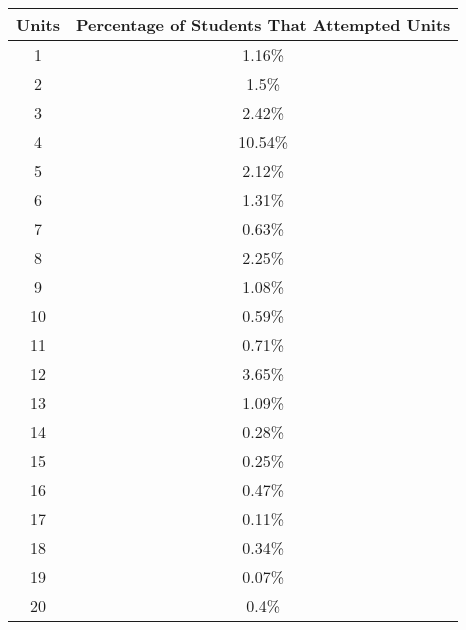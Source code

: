 \begin{center}
\begin{tabular}{|c|c|}
\hline
Units & Percentage of Students That Attempted Units \\ \hline
1     & 1.16\%                                      \\ \hline
2     & 1.5\%                                       \\ \hline
3     & 2.42\%                                      \\ \hline
4     & 10.54\%                                     \\ \hline
5     & 2.12\%                                      \\ \hline
6     & 1.31\%                                      \\ \hline
7     & 0.63\%                                      \\ \hline
8     & 2.25\%                                      \\ \hline
9     & 1.08\%                                      \\ \hline
10    & 0.59\%                                      \\ \hline
11    & 0.71\%                                      \\ \hline
12    & 3.65\%                                      \\ \hline
13    & 1.09\%                                      \\ \hline
14    & 0.28\%                                      \\ \hline
15    & 0.25\%                                      \\ \hline
16    & 0.47\%                                      \\ \hline
17    & 0.11\%                                      \\ \hline
18    & 0.34\%                                      \\ \hline
19    & 0.07\%                                      \\ \hline
20    & 0.4\%                                       \\ \hline
\end{tabular}
\end{center}
